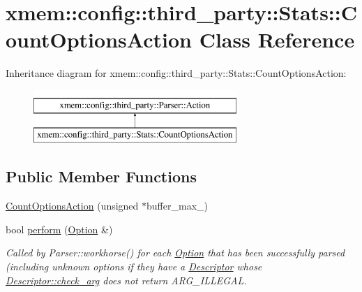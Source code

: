 \hypertarget{classxmem_1_1config_1_1third__party_1_1_stats_1_1_count_options_action}{}\section{xmem\+:\+:config\+:\+:third\+\_\+party\+:\+:Stats\+:\+:Count\+Options\+Action Class Reference}
\label{classxmem_1_1config_1_1third__party_1_1_stats_1_1_count_options_action}
Inheritance diagram for xmem\+:\+:config\+:\+:third\+\_\+party\+:\+:Stats\+:\+:Count\+Options\+Action\+:\begin{figure}[H]
\begin{center}
\leavevmode
\includegraphics[height=2.000000cm]{classxmem_1_1config_1_1third__party_1_1_stats_1_1_count_options_action}
\end{center}
\end{figure}
\subsection*{Public Member Functions}
\begin{DoxyCompactItemize}
\item 
\hyperlink{classxmem_1_1config_1_1third__party_1_1_stats_1_1_count_options_action_ae3105daa0bee8d16e4fbe17e6306bd1a}{Count\+Options\+Action} (unsigned $\ast$buffer\+\_\+max\+\_\+)
\item 
bool \hyperlink{classxmem_1_1config_1_1third__party_1_1_stats_1_1_count_options_action_aeacb83b2ed1520519dbfd678ac53b144}{perform} (\hyperlink{classxmem_1_1config_1_1third__party_1_1_option}{Option} \&)
\begin{DoxyCompactList}\small\item\em Called by Parser\+::workhorse() for each \hyperlink{classxmem_1_1config_1_1third__party_1_1_option}{Option} that has been successfully parsed (including unknown options if they have a \hyperlink{structxmem_1_1config_1_1third__party_1_1_descriptor}{Descriptor} whose \hyperlink{structxmem_1_1config_1_1third__party_1_1_descriptor_a65b39f8d61de820bb5001d590e7dea5d}{Descriptor\+::check\+\_\+arg} does not return A\+R\+G\+\_\+\+I\+L\+L\+E\+G\+A\+L. \end{DoxyCompactList}\end{DoxyCompactItemize}


